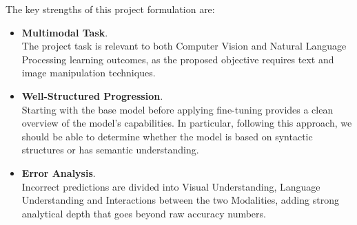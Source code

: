 The key strengths of this project formulation are:
\begin{itemize}
    \renewcommand{\labelitemi}{-}
    \item \textbf{Multimodal Task}. \\ 
    The project task is relevant to both Computer Vision and Natural Language Processing
    learning outcomes, as the proposed objective requires text and image manipulation 
    techniques.
    \item \textbf{Well-Structured Progression}. \\ 
    Starting with the base model before applying fine-tuning provides a clean overview 
    of the model's capabilities. In particular, following this approach, we should be 
    able to determine whether the model is based on syntactic structures or has semantic 
    understanding.
    \item \textbf{Error Analysis}. \\ 
    Incorrect predictions are divided into Visual Understanding, Language Understanding
    and Interactions between the two Modalities, adding strong analytical depth 
    that goes beyond raw accuracy numbers.
\end{itemize}